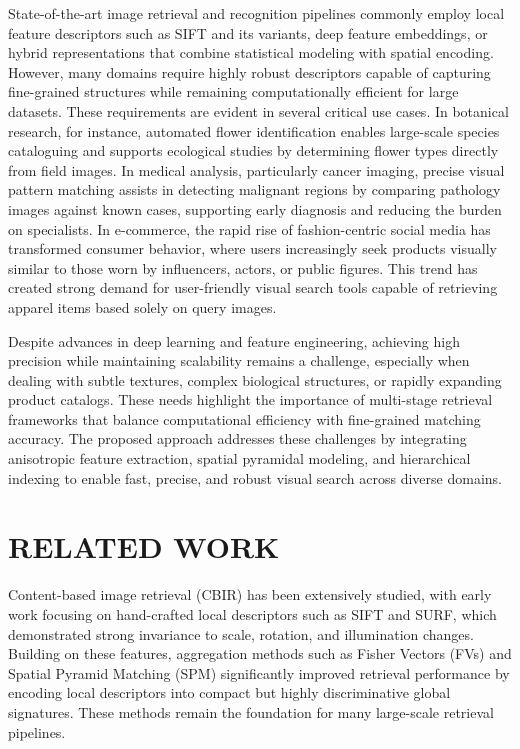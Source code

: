 \documentclass[conference]{IEEEtran}
\begin{document}
State-of-the-art image retrieval and recognition pipelines commonly employ local feature descriptors such as SIFT and its variants, deep feature embeddings, or hybrid representations that combine statistical modeling with spatial encoding. However, many domains require highly robust descriptors capable of capturing fine-grained structures while remaining computationally efficient for large datasets. These requirements are evident in several critical use cases. In botanical research, for instance, automated flower identification enables large-scale species cataloguing and supports ecological studies by determining flower types directly from field images. In medical analysis, particularly cancer imaging, precise visual pattern matching assists in detecting malignant regions by comparing pathology images against known cases, supporting early diagnosis and reducing the burden on specialists. In e-commerce, the rapid rise of fashion-centric social media has transformed consumer behavior, where users increasingly seek products visually similar to those worn by influencers, actors, or public figures. This trend has created strong demand for user-friendly visual search tools capable of retrieving apparel items based solely on query images.

Despite advances in deep learning and feature engineering, achieving high precision while maintaining scalability remains a challenge, especially when dealing with subtle textures, complex biological structures, or rapidly expanding product catalogs. These needs highlight the importance of multi-stage retrieval frameworks that balance computational efficiency with fine-grained matching accuracy. The proposed approach addresses these challenges by integrating anisotropic feature extraction, spatial pyramidal modeling, and hierarchical indexing to enable fast, precise, and robust visual search across diverse domains.


\section{RELATED WORK}
Content-based image retrieval (CBIR) has been extensively studied, with early work focusing on hand-crafted local descriptors such as SIFT and SURF, which demonstrated strong invariance to scale, rotation, and illumination changes. Building on these features, aggregation methods such as Fisher Vectors (FVs) and Spatial Pyramid Matching (SPM) significantly improved retrieval performance by encoding local descriptors into compact but highly discriminative global signatures. These methods remain the foundation for many large-scale retrieval pipelines.
\end{document}
